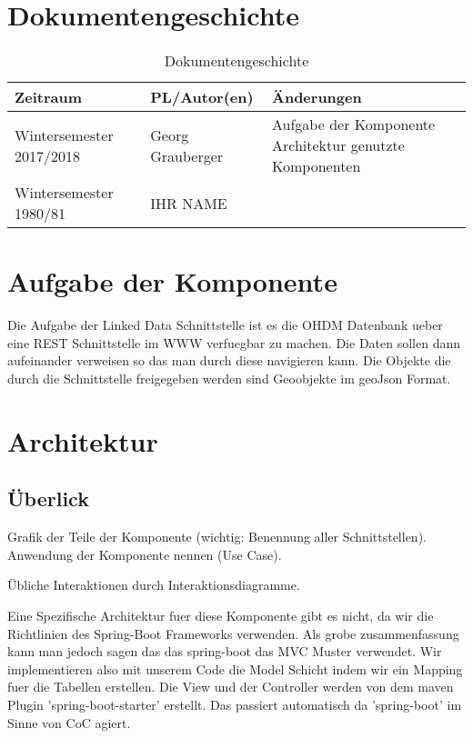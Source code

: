 \graphicspath{ {img/} }

\section{Dokumentengeschichte}
\begin{table}[h]
 \begin{tabular}{|l|l|p{4cm}|}
 \hline
 Zeitraum & PL/Autor(en) & Änderungen \\
 \hline
 Wintersemester 2017/2018 & Georg Grauberger & 
Aufgabe der Komponente \newline
Architektur \newline
genutzte Komponenten
 \\
 \hline
 Wintersemester 1980/81 & IHR NAME & 
 \\
 \hline
 \end{tabular}
 \caption{Dokumentengeschichte}
 \end{table}

\section{Aufgabe der Komponente}
Die Aufgabe der Linked Data Schnittstelle ist es die OHDM Datenbank ueber
eine REST Schnittstelle im WWW verfuegbar zu machen.\newline
Die Daten sollen dann aufeinander verweisen so das man durch diese navigieren
kann. Die Objekte die durch die Schnittstelle freigegeben werden sind Geoobjekte
im geoJson Format.
\section{Architektur}

\subsection{Überlick}
Grafik der Teile der Komponente (wichtig: Benennung aller Schnittstellen). 
Anwendung der Komponente nennen (Use Case).

Übliche Interaktionen durch Interaktionsdiagramme.

Eine Spezifische Architektur fuer diese Komponente gibt es nicht, da wir die Richtlinien
des Spring-Boot Frameworks verwenden.
Als grobe zusammenfassung kann man jedoch sagen das das spring-boot das MVC Muster verwendet.
Wir implementieren also mit unserem Code die Model Schicht indem wir ein Mapping
fuer die Tabellen erstellen.
Die View und der Controller werden von dem maven Plugin 'spring-boot-starter' erstellt.
Das passiert automatisch da 'spring-boot' im Sinne von CoC agiert.

